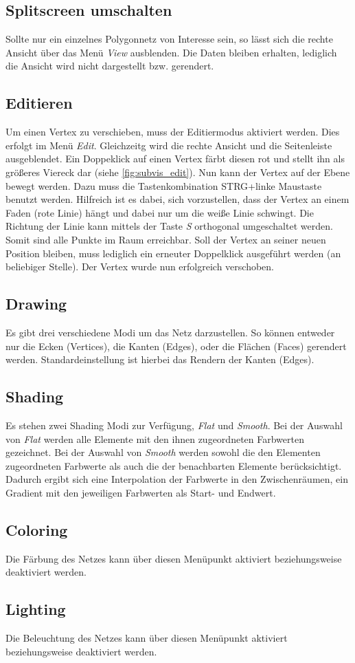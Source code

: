 \subsection{Splitscreen umschalten}

Sollte nur ein einzelnes Polygonnetz von Interesse sein, so lässt sich die rechte Ansicht über das Menü \emph{View} ausblenden.
Die Daten bleiben erhalten, lediglich die Ansicht wird nicht dargestellt bzw. gerendert.

\subsection{Editieren}

Um einen Vertex zu verschieben, muss der Editiermodus aktiviert werden. 
Dies erfolgt im Menü \emph{Edit}.
Gleichzeitg wird die rechte Ansicht und die Seitenleiste ausgeblendet.
Ein Doppeklick auf einen Vertex färbt diesen rot und stellt ihn als größeres Viereck dar (siehe \autoref{fig:subvis_edit}).
Nun kann der Vertex auf der Ebene bewegt werden. 
Dazu muss die Tastenkombination STRG+linke Maustaste benutzt werden.
Hilfreich ist es dabei, sich vorzustellen, dass der Vertex an einem Faden (rote Linie) hängt und dabei nur um die weiße Linie schwingt.
Die Richtung der Linie kann mittels der Taste \emph{S} orthogonal umgeschaltet werden. 
Somit sind alle Punkte im Raum erreichbar.
Soll der Vertex an seiner neuen Position bleiben, muss lediglich ein erneuter Doppelklick ausgeführt werden (an beliebiger Stelle).
Der Vertex wurde nun erfolgreich verschoben.

\subsection{Drawing}

Es gibt drei verschiedene Modi um das Netz darzustellen. So können entweder nur die Ecken (Vertices), die Kanten (Edges), oder die Flächen (Faces) gerendert werden. Standardeinstellung ist hierbei das Rendern der Kanten (Edges).

\subsection{Shading}

Es stehen zwei Shading Modi zur Verfügung, \textit{Flat} und \textit{Smooth}.
Bei der Auswahl von \textit{Flat} werden alle Elemente mit den ihnen zugeordneten Farbwerten gezeichnet.
Bei der Auswahl von \textit{Smooth} werden sowohl die den Elementen zugeordneten Farbwerte als auch die der benachbarten Elemente berücksichtigt.
Dadurch ergibt sich eine Interpolation der Farbwerte in den Zwischenräumen, ein Gradient mit den jeweiligen Farbwerten als Start- und Endwert.

\subsection{Coloring}

Die Färbung des Netzes kann über diesen Menüpunkt aktiviert beziehungsweise deaktiviert werden.


\subsection{Lighting}

Die Beleuchtung des Netzes kann über diesen Menüpunkt aktiviert beziehungsweise deaktiviert werden.